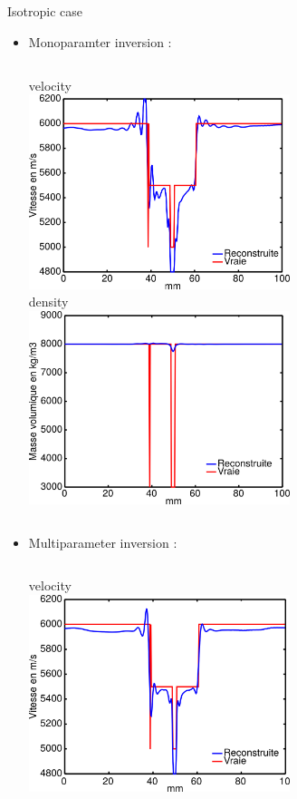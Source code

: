 \documentclass[10pt,xcolor=x11names,compress, notes=show]{beamer}%
\begin{document}
\subsection*{}
\begin{frame}{Isotropic case}
\begin{itemize}
	\item Monoparamter inversion : \\[0.2cm]
	\begin{columns}
		\centering
		\small{velocity} \\[0.2cm]
		\includegraphics[width=0.6\textwidth]{img/multi/coupe_vp_mono_smooth_hor.png}\\
		\centering
		\small{density} \\[0.2cm]
		\includegraphics[width=0.6\textwidth]{img/multi/coupe_rho_mono.png}\\
	\end{columns}
	\item Multiparameter inversion : \\[0.2cm]
	\begin{columns}
		\column{0.5\textwidth}
		\centering
		\small{velocity} \\[0.2cm]
		\includegraphics[width=0.6\textwidth]{img/multi/coupe_vp_multi.png}\\

\end{columns}
\end{itemize}
\end{frame}
\end{document}
